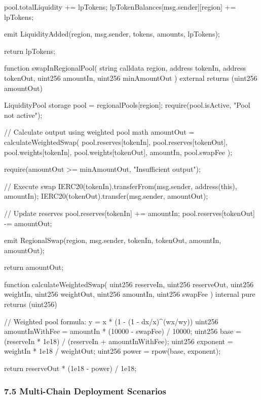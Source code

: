 \documentclass[12pt]{article}
\begin{document}
{{{{{        pool.totalLiquidity += lpTokens;        lpTokenBalances[msg.sender][region] += lpTokens;

        emit LiquidityAdded(region, msg.sender, tokens, amounts, lpTokens);

        return lpTokens;    }

    function swapInRegionalPool(        string calldata region,        address tokenIn,        address tokenOut,        uint256 amountIn,        uint256 minAmountOut    ) external returns (uint256 amountOut) {        LiquidityPool storage pool = regionalPools[region];        require(pool.isActive, "Pool not active");

        // Calculate output using weighted pool math        amountOut = calculateWeightedSwap(            pool.reserves[tokenIn],            pool.reserves[tokenOut],            pool.weights[tokenIn],            pool.weights[tokenOut],            amountIn,            pool.swapFee        );

        require(amountOut >= minAmountOut, "Insufficient output");

        // Execute swap        IERC20(tokenIn).transferFrom(msg.sender, address(this), amountIn);        IERC20(tokenOut).transfer(msg.sender, amountOut);

        // Update reserves        pool.reserves[tokenIn] += amountIn;        pool.reserves[tokenOut] -= amountOut;

        emit RegionalSwap(region, msg.sender, tokenIn, tokenOut, amountIn, amountOut);

        return amountOut;    }

    function calculateWeightedSwap(        uint256 reserveIn,        uint256 reserveOut,        uint256 weightIn,        uint256 weightOut,        uint256 amountIn,        uint256 swapFee    ) internal pure returns (uint256) {        // Weighted pool formula: y = x * (1 - (1 - dx/x)^(wx/wy))        uint256 amountInWithFee = amountIn * (10000 - swapFee) / 10000;        uint256 base = (reserveIn * 1e18) / (reserveIn + amountInWithFee);        uint256 exponent = weightIn * 1e18 / weightOut;        uint256 power = rpow(base, exponent);

        return reserveOut * (1e18 - power) / 1e18;    }}
\subsubsection{7.5 Multi-Chain Deployment Scenarios} %

}}}
\end{document}
